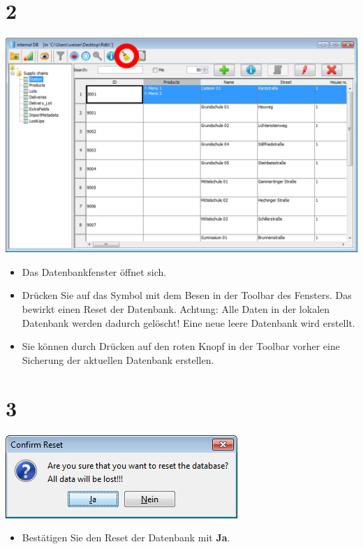 \documentclass{beamer}
\begin{document}
\section{2}
\begin{frame}
	\begin{center}
  		\includegraphics[height=0.6\textheight]{2.png}
	\end{center}
	\begin{itemize}
		\item Das Datenbankfenster öffnet sich.
		\item Drücken Sie auf das Symbol mit dem Besen in der Toolbar des Fensters. Das bewirkt einen Reset der Datenbank. Achtung: Alle Daten in der lokalen Datenbank werden dadurch gelöscht! Eine neue leere Datenbank wird erstellt.
		\item Sie können durch Drücken auf den roten Knopf in der Toolbar vorher eine Sicherung der aktuellen Datenbank erstellen.
	\end{itemize}
\end{frame}

\section{3}
\begin{frame}
	\begin{center}
  		\includegraphics[height=0.3\textheight]{3.png}
	\end{center}
	\begin{itemize}
		\item Bestätigen Sie den Reset der Datenbank mit \textbf{Ja}.
	\end{itemize}
\end{frame}
\end{document}
